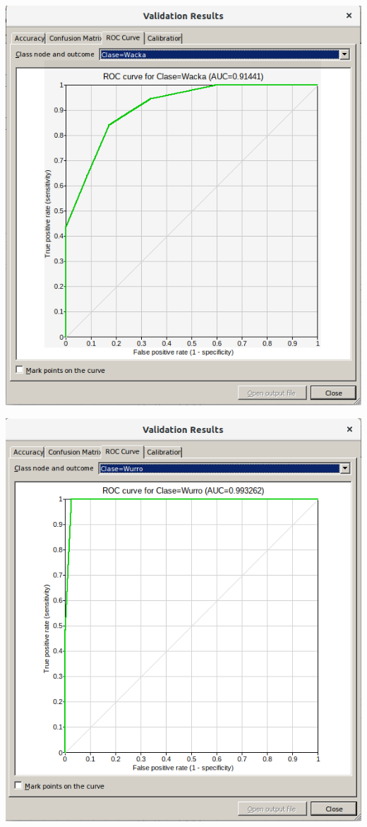 \documentclass{article}
\begin{document}
\begin{center}
\includegraphics[scale=0.4]{images/4w1.png}
\end{center}

\begin{center}
\includegraphics[scale=0.4]{images/4w2.png}
\end{center}
\end{document}
